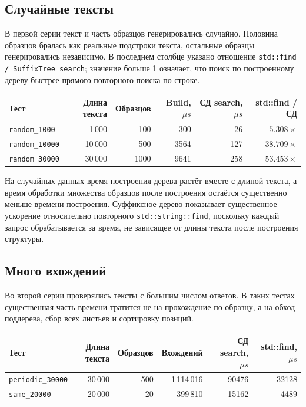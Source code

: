 \subsection{Случайные тексты}

В первой серии текст и часть образцов генерировались случайно. Половина образцов бралась как реальные
подстроки текста, остальные образцы генерировались независимо. В последнем столбце указано отношение
\texttt{std::find / SuffixTree search}; значение больше 1 означает, что поиск по построенному дереву
быстрее прямого повторного поиска по строке.

\begin{center}
\small
\begin{tabular}{|l|r|r|r|r|r|}
\hline
\rowcolor{lightgray}
Тест & Длина текста & Образцов & Build, \(\mu s\) & СД search, \(\mu s\) & std::find / СД \\
\hline
\texttt{random\_1000} & 1\,000 & 100 & 300 & 26 & \(5.308\times\) \\
\hline
\texttt{random\_10000} & 10\,000 & 500 & 3564 & 127 & \(38.709\times\) \\
\hline
\texttt{random\_30000} & 30\,000 & 1000 & 9641 & 258 & \(53.453\times\) \\
\hline
\end{tabular}
\end{center}

На случайных данных время построения дерева растёт вместе с длиной текста, а время обработки множества
образцов после построения остаётся существенно меньше времени построения. Суффиксное дерево показывает
существенное ускорение относительно повторного \texttt{std::string::find}, поскольку каждый запрос
обрабатывается за время, не зависящее от длины текста после построения структуры.

\subsection{Много вхождений}

Во второй серии проверялись тексты с большим числом ответов. В таких тестах существенная часть времени
тратится не на прохождение по образцу, а на обход поддерева, сбор всех листьев и сортировку позиций.

\begin{center}
\small
\begin{tabular}{|l|r|r|r|r|r|}
\hline
\rowcolor{lightgray}
Тест & Длина текста & Образцов & Вхождений & СД search, \(\mu s\) & std::find, \(\mu s\) \\
\hline
\texttt{periodic\_30000} & 30\,000 & 500 & 1\,114\,016 & 90476 & 32128 \\
\hline
\texttt{same\_20000} & 20\,000 & 20 & 399\,810 & 15162 & 4489 \\
\hline
\end{tabular}
\end{center}

